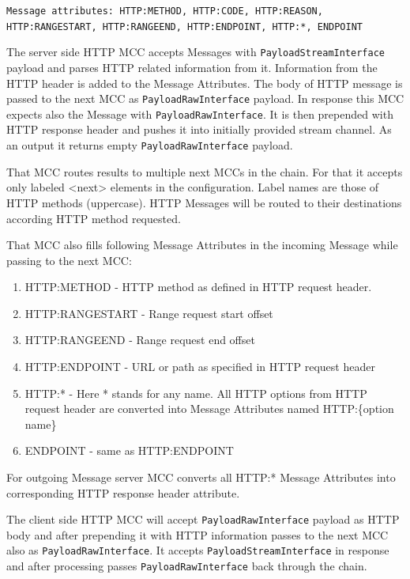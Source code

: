 \documentclass{book}
\begin{document}
\texttt{Message attributes: HTTP:METHOD, HTTP:CODE, HTTP:REASON, HTTP:RANGESTART, HTTP:RANGEEND, HTTP:ENDPOINT, HTTP:*, ENDPOINT}


The server side HTTP MCC accepts Messages with \texttt{PayloadStreamInterface} payload and parses HTTP related information from it. Information from the HTTP header is added to the Message Attributes. The body of HTTP message is passed to the next MCC as \texttt{PayloadRawInterface} payload. In response this MCC expects also the Message with \texttt{PayloadRawInterface}. It is then prepended with HTTP response header and pushes it into initially provided stream channel. As an output it returns empty \texttt{PayloadRawInterface} payload.

That MCC routes results to multiple next MCCs in the chain. For that it accepts only labeled <next> elements in the configuration. Label names are those of HTTP methods (uppercase). HTTP Messages will be routed to their destinations according HTTP method requested.

That MCC also fills following Message Attributes in the incoming Message while passing to the next MCC:
\begin{enumerate}

\item HTTP:METHOD - HTTP method as defined in HTTP request header.

\item HTTP:RANGESTART - Range request start offset

\item HTTP:RANGEEND - Range request end offset

\item HTTP:ENDPOINT - URL or path as specified in HTTP request header

\item HTTP:* - Here * stands for any name. All HTTP options from HTTP request header are converted into Message Attributes named HTTP:\{option name\}

\item ENDPOINT - same as HTTP:ENDPOINT

\end{enumerate}

For outgoing Message server MCC converts all HTTP:* Message Attributes into corresponding HTTP response header attribute.

The client side HTTP MCC will accept \texttt{PayloadRawInterface} payload as HTTP body and after prepending it with HTTP information passes to the next MCC also as \texttt{PayloadRawInterface}. It accepts \texttt{PayloadStreamInterface} in response and after processing passes \texttt{PayloadRawInterface} back through the chain.
\end{document}
